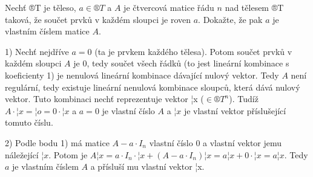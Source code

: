 \documentclass[10pt]{article}                   %
\begin{document}
\begin{priklad}[4.1]
    Nechť ®T je těleso, $a \in ®T$ a $A$ je čtvercová matice řádu $n$ nad tělesem ®T taková, že součet prvků v každém sloupci je roven $a$. Dokažte, že pak $a$ je vlastním číslem matice $A$.

    \begin{dukazin}
        1) Nechť nejdříve $a = 0$ (ta je prvkem každého tělesa). Potom součet prvků v každém sloupci $A$ je 0, tedy součet všech řádků (to jest lineární kombinace s koeficienty 1) je nenulová lineární kombinace dávající nulový vektor. Tedy $A$ není regulární, tedy existuje lineární nenulová kombinace sloupců, která dává nulový vektor. Tuto kombinaci nechť reprezentuje vektor ¦x ($\in ®T^{n}$). Tudíž $A·¦x = ¦o = 0·¦x$ a $a = 0$ je vlastní číslo $A$ a $¦x$ je vlastní vektor příslušející tomuto číslu.

        2) Podle bodu 1) má matice $A - a·I_n$ vlastní číslo 0 a vlastní vektor jemu náležející $¦x$. Potom je $A¦x = a·I_n·¦x + (A - a·I_n)¦x = a¦x + 0·¦x = a¦x$. Tedy $a$ je vlastním číslem $A$ a přísluší mu vlastní vektor ¦x.
    \end{dukazin}
\end{priklad}
\end{document}
